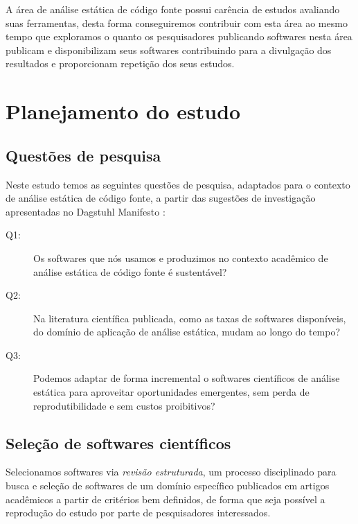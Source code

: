A área de análise estática de código fonte possui carência de estudos avaliando
suas ferramentas, desta forma conseguiremos contribuir com esta área ao mesmo
tempo que exploramos o quanto os pesquisadores publicando softwares nesta área
publicam e disponibilizam seus softwares contribuindo para a divulgação dos
resultados e proporcionam repetição dos seus estudos.

\section{Planejamento do estudo}

\subsection{Questões de pesquisa}

Neste estudo temos as seguintes questões de pesquisa, adaptados para o contexto
de análise estática de código fonte, a partir das sugestões de investigação
apresentadas no Dagstuhl Manifesto \cite{allen2017engineering}:

\newcommand{\QuestaoUm}{Os softwares que nós usamos e produzimos no contexto
acadêmico de análise estática de código fonte é sustentável?}

\newcommand{\QuestaoDois}{Na literatura científica publicada, como as taxas de
softwares disponíveis, do domínio de aplicação de análise estática, mudam ao
longo do tempo?}

\newcommand{\QuestaoTres}{Podemos adaptar de forma incremental o softwares
científicos de análise estática para aproveitar oportunidades emergentes, sem
perda de reprodutibilidade e sem custos proibitivos?}

\begin{description}
  \item [Q1:] \QuestaoUm
  \item [Q2:] \QuestaoDois
  \item [Q3:] \QuestaoTres
\end{description}

\subsection{Seleção de softwares científicos}

Selecionamos softwares via {\it revisão estruturada}, um processo disciplinado
para busca e seleção de softwares de um domínio específico publicados em
artigos acadêmicos a partir de critérios bem definidos, de forma que seja
possível a reprodução do estudo por parte de pesquisadores interessados.

